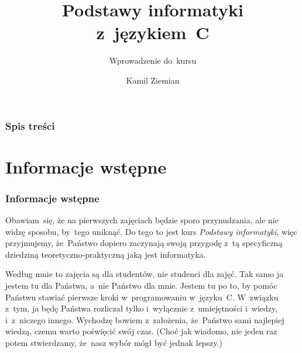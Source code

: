 \documentclass[10pt,t]{beamer}
\title{Podstawy informatyki z~językiem~C}
\subtitle{Wprowadzenie do~kursu}
\author{Kamil Ziemian \\
  \email}
\begin{document}





\RaggedRight





\maketitle





\begin{frame}
  \frametitle{Spis treści}


  \tableofcontents

\end{frame}





\section{Informacje wstępne}



\begin{frame}
  \frametitle{Informacje wstępne}


  Obawiam~się, że na pierwszych zajęciach będzie sporo przynudzania,
  ale nie widzę sposobu, by~tego uniknąć. Do tego to jest kurs
  \textit{Podstawy informatyki}, więc przyjmujemy, że~Państwo dopiero
  zaczynają swoją przygodę z~tą specyficzną dziedziną
  teoretyczno-praktyczną jaką jest informatyka.

  Według mnie to zajęcia są dla studentów, nie studenci dla zajęć. Tak samo
  ja jestem tu dla Państwa, a~nie Państwo dla mnie. Jestem tu po to, by
  pomóc Państwu stawiać pierwsze kroki w~programowaniu w~języku~C.
  W~związku z~tym, ja będę Państwa rozliczał tylko i~wyłącznie
  z~umiejętności i~wiedzy, i~z~niczego innego. Wychodzę bowiem z~założenia,
  że~Państwo sami najlepiej wiedzą, czemu warto poświęcić swój czas. (Choć
  jak wiadomo, nie jeden raz potem stwierdzamy, że~nasz wybór mógł być
  jednak lepszy.)

\end{frame}
\end{document}
